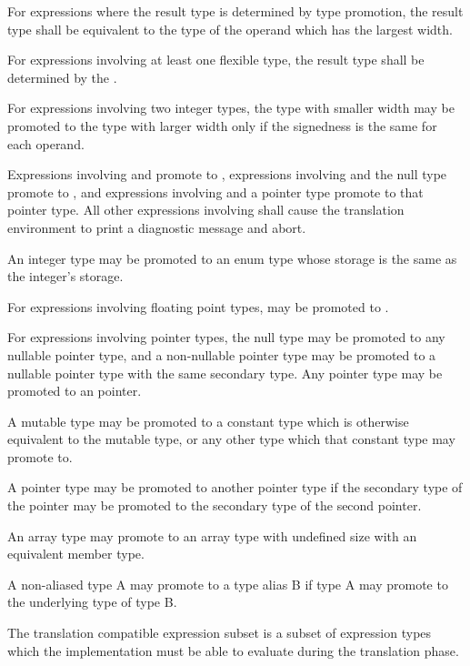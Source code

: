 \specsubitem
For expressions where the result type is determined by type promotion, the
result type shall be equivalent to the type of the operand which has the largest
width.

\specsubitem
For expressions involving at least one flexible type, the result type shall be
determined by the .

\specsubitem
For expressions involving two integer types, the type with smaller width may be
promoted to the type with larger width only if the signedness is the same for
each operand.

\specsubitem
Expressions involving  and  promote to
, expressions involving  and the null type
promote to , and expressions involving  and
a pointer type promote to that pointer type. All other expressions involving
 shall cause the translation environment to print a diagnostic
message and abort.

\specsubitem
An integer type may be promoted to an enum type whose storage is the
same as the integer's storage.

\specsubitem
For expressions involving floating point types,  may be promoted
to .

\specsubitem
For expressions involving pointer types, the null type may be promoted to any
nullable pointer type, and a non-nullable pointer type may be promoted to
a nullable pointer type with the same secondary type. Any pointer type may be
promoted to an  pointer.

\specsubitem
A mutable type may be promoted to a constant type which is otherwise equivalent
to the mutable type, or any other type which that constant type may promote to.

\specsubitem
A pointer type may be promoted to another pointer type if the secondary type of
the pointer may be promoted to the secondary type of the second pointer.

\specsubitem
An array type may promote to an array type with undefined size with an
equivalent member type.

\specsubitem
A non-aliased type A may promote to a type alias B if type A may promote to the
underlying type of type B.


The translation compatible expression subset is a subset of expression types
which the implementation must be able to evaluate during the translation phase.

